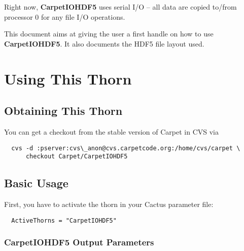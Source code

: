 Right now, {\bf CarpetIOHDF5} uses serial I/O -- all data are copied to/from
processor 0 for any file I/O operations.

This document aims at giving the user a first handle on how to use
{\bf CarpetIOHDF5}. It also documents the HDF5 file layout used.


\section{Using This Thorn}

\subsection{Obtaining This Thorn}

You can get a checkout from the stable version of Carpet in CVS via

\begin{verbatim}
  cvs -d :pserver:cvs\_anon@cvs.carpetcode.org:/home/cvs/carpet \
      checkout Carpet/CarpetIOHDF5
\end{verbatim}


\subsection{Basic Usage}

First, you have to activate the thorn in your Cactus parameter file:

\begin{verbatim}
  ActiveThorns = "CarpetIOHDF5"
\end{verbatim}

\subsubsection{CarpetIOHDF5 Output Parameters}

